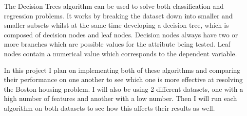 The Decision Trees algorithm can be used to solve both classification and regression problems. It works by breaking the dataset down into smaller and smaller subsets whilst at the same time developing a decision tree, which is composed of decision nodes and leaf nodes. Decision nodes always have two or more branches which are possible values for the attribute being tested. Leaf nodes contain a numerical value which corresponds to the dependent variable.\cite{Saed_Sayad_DT}

In this project I plan on implementing both of these algorithms and comparing their performance on one another to see which one is more effective at resolving the Boston housing problem. I will also be using 2 different datasets, one with a high number of features and another with a low number. Then I will run each algorithm on both datasets to see how this affects their results as well. 





